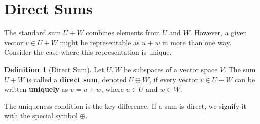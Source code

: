 \documentclass[11pt]{article}
\theoremstyle{definition}
\newtheorem{definition}[theorem]{Definition}
\theoremstyle{remark}
\newcommand{\directsum}{\oplus}
\begin{document}
\section{Direct Sums}

The standard sum $U+W$ combines elements from $U$ and $W$. However, a given vector $v \in U+W$ might be representable as $u+w$ in more than one way. Consider the case where this representation is unique.

\begin{definition}[Direct Sum]
Let $U, W$ be subspaces of a vector space $V$. The sum $U+W$ is called a \textbf{direct sum}, denoted $U \directsum W$, if every vector $v \in U+W$ can be written \textbf{uniquely} as $v = u+w$, where $u \in U$ and $w \in W$.
\end{definition}

The uniqueness condition is the key difference. If a sum is direct, we signify it with the special symbol $\directsum$.
\end{document}
